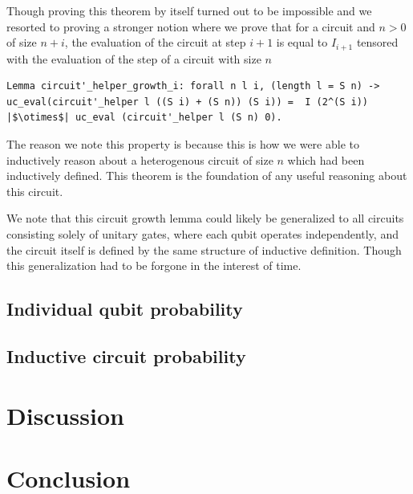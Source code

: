 \documentclass{article}
\begin{document}
Though proving this theorem by itself turned out to be impossible and we resorted to proving a stronger notion where we prove that for a circuit and $n>0$ of size $n+i$, the evaluation of the circuit at step $i+1$ is equal to $I_{i+1}$ tensored with the evaluation of the  step of a circuit with size $n$
\begin{verbatim}
Lemma circuit'_helper_growth_i: forall n l i, (length l = S n) -> uc_eval(circuit'_helper l ((S i) + (S n)) (S i)) =  I (2^(S i)) |$\otimes$| uc_eval (circuit'_helper l (S n) 0).
\end{verbatim}

The reason we note this property is because this is how we were able to inductively reason about a heterogenous circuit of size $n$ which had been inductively defined.
This theorem is the foundation of any useful reasoning about this circuit.

We note that this circuit growth lemma could likely be generalized to all circuits consisting solely of unitary gates, where each qubit operates independently, and the circuit itself is defined by the same structure of inductive definition. Though this generalization had to be forgone in the interest of time.
\subsection{Individual qubit probability}
\subsection{Inductive circuit probability}

\section{Discussion}

\section{Conclusion}




\end{document}
